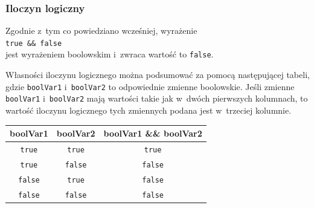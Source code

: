 \documentclass[10pt,t]{beamer}
\begin{document}
\begin{frame}
  \frametitle{Iloczyn logiczny}


  Zgodnie z~tym co powiedziano wcześniej, wyrażenie \\
  \texttt{true \&\& false} \\
  jest wyrażeniem boolowskim i~zwraca wartość to \texttt{false}.

  Własności iloczynu logicznego można podsumować za pomocą następującej
  tabeli, gdzie \texttt{boolVar1} i~\texttt{boolVar2} to odpowiednie zmienne
  boolowskie. Jeśli zmienne \texttt{boolVar1} i~\texttt{boolVar2} mają
  wartości takie jak w~dwóch pierwszych kolumnach, to wartość iloczynu
  logicznego tych zmiennych podana jest w~trzeciej kolumnie.

  \vspace{1em}





  \begingroup

  \centering

  \begin{tabular}{|c|c|c|}
    \hline
    boolVar1 & boolVar2 & boolVar1 \&\& boolVar2 \\
    \hline
    \texttt{true}  & \texttt{true}  & \texttt{true}  \\
    \texttt{true}  & \texttt{false} & \texttt{false} \\
    \texttt{false} & \texttt{true}  & \texttt{false} \\
    \texttt{false} & \texttt{false} & \texttt{false} \\
    \hline
  \end{tabular}

  \endgroup

\end{frame}
\end{document}
